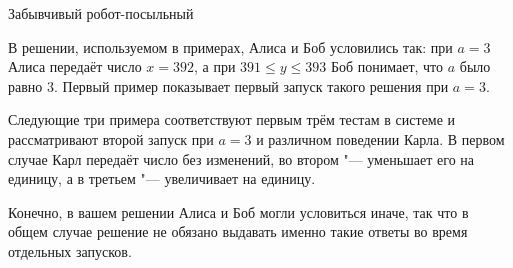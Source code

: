 \begin{problem}{Забывчивый робот-посыльный}
\Explanations

В решении, используемом в примерах, Алиса и Боб условились так:
при $a = 3$ Алиса передаёт число $x = 392$,
а при $391 \le y \le 393$ Боб понимает, что $a$ было равно $3$.
Первый пример показывает первый запуск такого решения при $a = 3$.

Следующие три примера соответствуют первым трём тестам в системе
и рассматривают второй запуск при $a = 3$ и различном поведении Карла.
В первом случае Карл передаёт число без изменений,
во втором "--- уменьшает его на единицу,
а в третьем "--- увеличивает на единицу.

Конечно, в вашем решении Алиса и Боб могли условиться иначе,
так что в общем случае решение не обязано выдавать именно такие ответы
во время отдельных запусков.

\end{problem}
